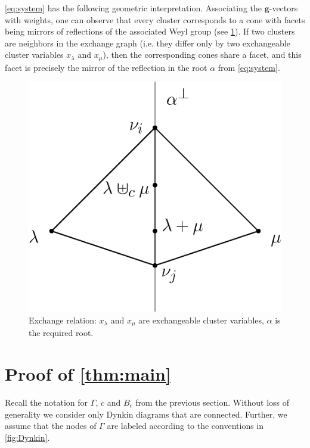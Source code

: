 \documentclass[pdftex]{sigma}
\numberwithin{equation}{section}
\numberwithin{theorem}{section}
\numberwithin{proposition}{section}
\numberwithin{lemma}{section}
\numberwithin{corollary}{section}
\numberwithin{definition}{section}
\numberwithin{example}{section}
\numberwithin{remark}{section}
\numberwithin{note}{section}
\newcommand{\bg}{\mathbf{g}}
\begin{document}
  \begin{remark}
    \label{geom}
    \cref{eq:system} has the following geometric interpretation.
    Associating the $\bg$-vectors with weights, one can observe that every cluster corresponds to a cone with facets being mirrors of reflections of the associated Weyl group (see \cref{fig:exchange_relation}).
    If two clusters are neighbors in the exchange graph (i.e. they differ only by two exchangeable cluster variables $x_\lambda$ and $x_\mu$), then the corresponding cones share a facet, and this facet is precisely the mirror of the reflection in the root $\alpha$ from \cref{eq:system}.
   \begin{figure}[ht]
      \begin{center}
        \includegraphics[scale=0.4]{cones-section.eps}
      \end{center}
      \caption{Exchange relation: $x_\lambda$ and $x_\mu$ are exchangeable cluster variables, $\alpha$ is the required root.}
      \label{fig:exchange_relation}
    \end{figure}
\end{remark}

\section{Proof of \cref{thm:main}}
\label{proof}
  Recall the notation for $\Gamma$, $c$ and $B_c$ from the previous section.
  Without loss of generality we consider only Dynkin diagrams that are connected.
  Further, we assume that the nodes of $\Gamma$ are labeled according to the conventions in \cref{fig:Dynkin}.
\end{document}
